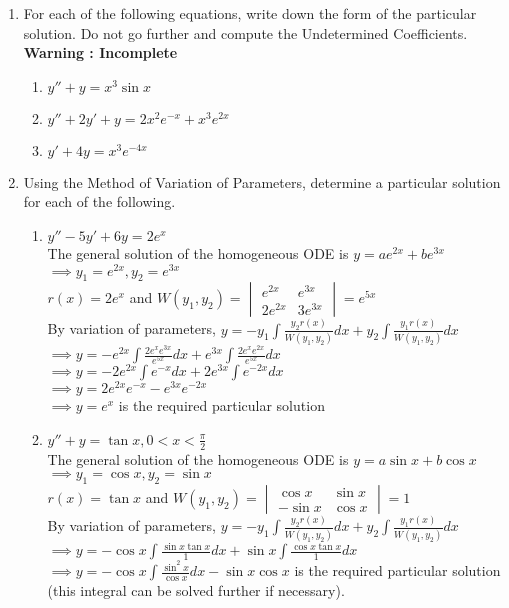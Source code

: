 \documentclass[a4paper]{article}
\begin{document}
\begin{enumerate}
\item For each of the following equations, write down the form of the particular solution. Do not go further and compute the Undetermined Coefficients.\\
\textbf{Warning : Incomplete}
\begin{enumerate}
	\item $y''+y=x^3\sin x$
	\item $y''+2y'+y=2x^2e^{-x}+x^3e^{2x}$
	\item $y'+4y=x^3e^{-4x}$
\end{enumerate}

\item Using the Method of Variation of Parameters, determine a particular solution for each of the following.
\begin{enumerate}
	\item $y''-5y'+6y=2e^x$\\
	The general solution of the homogeneous ODE is $y=ae^{2x}+be^{3x}$\\
	$\implies y_1=e^{2x}, y_2=e^{3x}$\\
	$r(x)=2e^x$ and $W(y_1,y_2)=\begin{vmatrix}
	e^{2x} & e^{3x}\\
	2e^{2x} & 3e^{3x}
	\end{vmatrix} = e^{5x}$\\
	By variation of parameters, $y=-y_1\int \frac{y_2 r(x)}{W(y_1,y_2)} dx + y_2\int \frac{y_1 r(x)}{W(y_1,y_2)}dx$\\
	$\implies y=-e^{2x}\int \frac{2e^xe^{3x}}{e^{5x}} dx + e^{3x}\int \frac{2e^xe^{2x}}{e^{5x}}dx$\\
	$\implies y=-2e^{2x}\int e^{-x} dx + 2e^{3x}\int e^{-2x} dx$\\
	$\implies y=2e^{2x} e^{-x} - e^{3x} e^{-2x} $\\
	$\implies y=e^{x}$ is the required particular solution

	\item $y''+y=\tan x, 0<x<\frac{\pi}{2}$\\
	The general solution of the homogeneous ODE is $y=a\sin x+b\cos x$\\
	$\implies y_1=\cos x, y_2=\sin x$\\
	$r(x)=\tan x$ and $W(y_1,y_2)=\begin{vmatrix}
	\cos x & \sin x\\
	-\sin x & \cos x
	\end{vmatrix} = 1$\\
	By variation of parameters, $y=-y_1\int \frac{y_2 r(x)}{W(y_1,y_2)} dx + y_2\int \frac{y_1 r(x)}{W(y_1,y_2)}dx$\\
	$\implies y=-\cos x\int \frac{\sin x \tan x}{1} dx + \sin x\int \frac{\cos x \tan x}{1}dx$\\
	$\implies y=-\cos x\int \frac{\sin^2 x}{\cos x} dx - \sin x\cos x$ is the required particular solution (this integral can be solved further if necessary).
	

\end{enumerate}
\end{enumerate}
\end{document}
